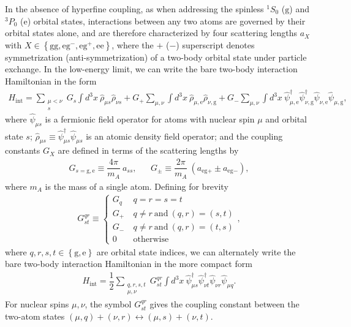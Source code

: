 \documentclass[preprint,showkeys,nofootinbib]{revtex4-1}
\renewcommand{\t}{\text} %
\newcommand{\f}{\dfrac} %
\newcommand{\p}[1]{\left(#1\right)} %
\renewcommand{\set}[1]{\left\{#1\right\}} %
\newcommand{\g}{\text{g}}
\newcommand{\e}{\text{e}}
\newcommand{\1}{\mathds{1}}
\begin{document}
In the absence of hyperfine coupling, as when addressing the spinless
${}^1S_0$ ($\g$) and ${}^3P_0$ ($\e$) orbital states, interactions
between any two atoms are governed by their orbital states alone, and
are therefore characterized by four scattering lengths $a_X$ with
$X\in\set{\g\g,\e\g^-,\e\g^+,\e\e}$, where the $+$ ($-$) superscript
denotes symmetrization (anti-symmetrization) of a two-body orbital
state under particle exchange.  In the low-energy limit, we can write
the bare two-body interaction Hamiltonian in the form
\cite{gorshkov2010twoorbital}
\begin{align}
  H_{\t{int}} = \sum_{\substack{\mu<\nu\\s}}
  G_s \int d^3x~ \hat\rho_{\mu s} \hat\rho_{\nu s}
  + G_+ \sum_{\mu,\nu}
  \int d^3x~ \hat\rho_{\mu,\e} \hat\rho_{\nu,\g}
  + G_- \sum_{\mu,\nu} \int d^3x~
  \hat\psi_{\mu,\e}^\dag \hat\psi_{\nu,\g}^\dag
  \hat\psi_{\nu,\e} \hat\psi_{\mu,\g},
\end{align}
where $\hat\psi_{\mu s}$ is a fermionic field operator for atoms with
nuclear spin $\mu$ and orbital state $s$;
$\hat\rho_{\mu s}\equiv\hat\psi_{\mu s}^\dag\hat\psi_{\mu s}$ is an
atomic density field operator; and the coupling constants $G_X$ are
defined in terms of the scattering lengths by
\begin{align}
  G_{s=\g,\e} \equiv \f{4\pi}{m_A}~ a_{ss}, &&
  G_\pm \equiv \f{2\pi}{m_A}~ \p{a_{\e\g+} \pm a_{\e\g-}},
  \label{eq:couplings}
\end{align}
where $m_A$ is the mass of a single atom.  Defining for brevity
\begin{align}
  G^{qr}_{st} \equiv \left\{
    \begin{array}{ll}
      G_q & ~ q = r = s = t \\
      G_+ & ~ q \ne r ~ \t{and} ~ (q,r) = (s,t) \\
      G_- & ~ q \ne r ~ \t{and} ~ (q,r) = (t,s) \\
      0 & ~ \t{otherwise}
    \end{array}\right.,
  \label{eq:coupling_tensor}
\end{align}
where $q,r,s,t\in\set{\g,\e}$ are orbital state indices, we can
alternately write the bare two-body interaction Hamiltonian in the
more compact form
\begin{align}
  H_{\t{int}}
  = \f12 \sum_{\substack{q,r,s,t\\\mu,\nu}} G^{qr}_{st} \int d^3x~
  \hat\psi_{\mu s}^\dag \hat\psi_{\nu t}^\dag
  \hat\psi_{\nu r} \hat\psi_{\mu q}.
  \label{eq:H_int_fields}
\end{align}
For nuclear spins $\mu,\nu$, the symbol $G^{qr}_{st}$ gives the
coupling constant between the two-atom states
$(\mu,q)+(\nu,r)\leftrightarrow(\mu,s)+(\nu,t)$.
\end{document}
